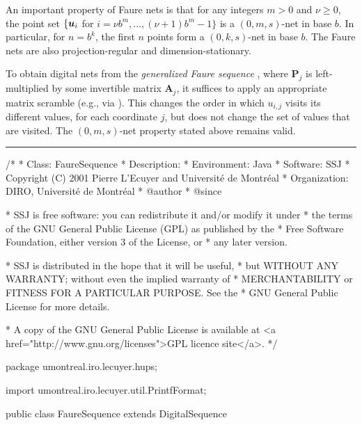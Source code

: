 An important property of Faure nets is that for any integers $m > 0$
and $\nu\ge 0$, the point set
$\{\mbox{\boldmath $u$}_i$ for $i = \nu b^m,\dots, (\nu+1)b^m -1\}$
is a $(0,m,s)$-net in base $b$.
In particular, for $n = b^k$, the first $n$ points form a
 $(0,k,s)$-net in base $b$.
The Faure nets are also projection-regular and dimension-stationary.

To obtain digital nets from the \emph{generalized Faure sequence}
, where $\mathbf{P}_j$ is left-multiplied by some
invertible matrix $\mathbf{A}_j$, it suffices to apply an appropriate
matrix scramble (e.g., via ).
This changes the order in which $u_{i,j}$ visits its different
values, for each coordinate $j$, but does not change the set of values
that are visited.  The $(0,m,s)$-net property stated above remains valid.


\bigskip\hrule\bigskip

\begin{code}
\begin{hide}
/*
 * Class:        FaureSequence
 * Description:  
 * Environment:  Java
 * Software:     SSJ 
 * Copyright (C) 2001  Pierre L'Ecuyer and Université de Montréal
 * Organization: DIRO, Université de Montréal
 * @author       
 * @since

 * SSJ is free software: you can redistribute it and/or modify it under
 * the terms of the GNU General Public License (GPL) as published by the
 * Free Software Foundation, either version 3 of the License, or
 * any later version.

 * SSJ is distributed in the hope that it will be useful,
 * but WITHOUT ANY WARRANTY; without even the implied warranty of
 * MERCHANTABILITY or FITNESS FOR A PARTICULAR PURPOSE.  See the
 * GNU General Public License for more details.

 * A copy of the GNU General Public License is available at
   <a href="http://www.gnu.org/licenses">GPL licence site</a>.
 */
\end{hide}
package umontreal.iro.lecuyer.hups;\begin{hide}
import umontreal.iro.lecuyer.util.PrintfFormat;

\end{hide}

public class FaureSequence extends DigitalSequence \begin{hide} {

    // Maximum dimension for the case where b is not specified.
    // Can be extended by extending the precomputed array prime[].
    private static final int MAXDIM = 500;

    // For storing the generator matrices for given dim and numPoints.
    private int[][][] v;
\end{hide}
\end{code}
